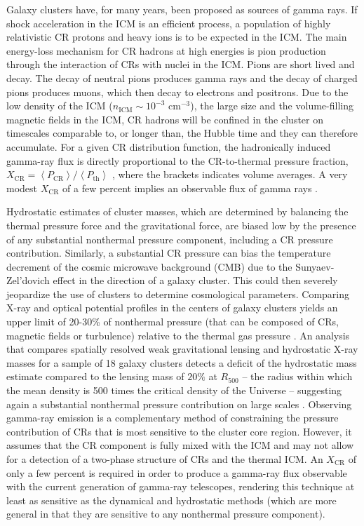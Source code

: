 \documentclass[12pt,manuscript]{aastex}
\newcommand{\expval}[1]{\left\langle #1 \right\rangle}
\newcommand{\CR}{\mathrm{CR}}
\begin{document}
Galaxy clusters have, for many years, been proposed as sources of gamma rays. If shock acceleration
in the ICM is an efficient process, a population of highly relativistic CR protons and heavy ions is
to be expected in the ICM. The main energy-loss mechanism for CR hadrons at high energies is pion
production through the interaction of CRs with nuclei in the ICM. Pions are short lived and decay.
The decay of neutral pions produces gamma rays and the decay of charged pions produces muons, which
then decay to electrons and positrons. Due to the low density of the ICM ($n_{\mathrm{ICM}}\sim
10^{-3}$ cm$^{-3}$), the large size and the volume-filling magnetic fields in the ICM, CR hadrons
will be confined in the cluster on timescales comparable to, or longer than, the Hubble time
\citep[][]{article:Volk_etal:1996, article:Berezinsky_etal:1997} and they can therefore
accumulate. For a given CR distribution function, the hadronically induced gamma-ray flux is
directly proportional to the CR-to-thermal pressure fraction, $X_\CR=\expval{P_{\CR}}/
\expval{P_{\mathrm{th}}}$ \citep[see, e.g.,][]{article:EnsslinPfrommerSpringelJubelgas:2007}, where
the brackets indicates volume averages. A very modest $X_{\CR}$ of a few percent implies an
observable flux of gamma rays \citep[e.g.,][]{article:PfrommerEnsslin:2004b}.

Hydrostatic estimates of cluster masses, which are determined by balancing the thermal pressure
force and the gravitational force, are biased low by the presence of any substantial nonthermal
pressure component, including a CR pressure contribution. Similarly, a substantial CR
pressure can bias the temperature decrement of the cosmic microwave background (CMB) due to the
Sunyaev-Zel'dovich effect in the direction of a galaxy cluster. This could then severely
jeopardize the use of clusters to determine cosmological parameters. Comparing X-ray and optical
potential profiles in the centers of galaxy clusters yields an upper limit of 20-30\% of nonthermal
pressure (that can be composed of CRs, magnetic fields or turbulence) relative to the thermal gas
pressure \citep{article:Churazov_etal:2008, article:Churazov_etal:2010}. An analysis that compares
spatially resolved weak gravitational lensing and hydrostatic X-ray masses for a sample of 18 galaxy
clusters detects a deficit of the hydrostatic mass estimate compared to the lensing mass of $20\%$
at $R_{500}$ -- the radius within which the mean density is 500 times the critical density of the
Universe -- suggesting again a substantial nonthermal pressure contribution on large scales
\citep{article:Mahdavi_etal:2008}. Observing gamma-ray emission is a complementary method of
constraining the pressure contribution of CRs that is most sensitive to the cluster core
region. However, it assumes that the CR component is fully mixed with the ICM and may not allow for
a detection of a two-phase structure of CRs and the thermal ICM. An $X_\CR$ of only a few percent is
required in order to produce a gamma-ray flux observable with the current generation of gamma-ray
telescopes, rendering this technique at least as sensitive as the dynamical and hydrostatic methods
(which are more general in that they are sensitive to any nonthermal pressure component).
\end{document}
